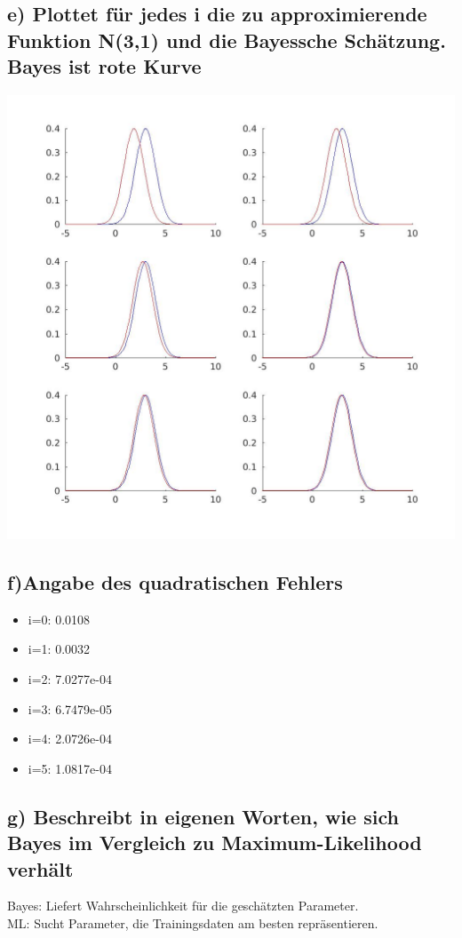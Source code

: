 \documentclass{scrartcl}
\begin{document}
\subsection*{e) Plottet für jedes i die zu approximierende Funktion N(3,1) und die Bayessche Schätzung. Bayes ist rote Kurve}
\includegraphics[width=1\textwidth]{plots/ApproxVsBayes.jpg} 

\subsection*{f)Angabe des quadratischen Fehlers }
\begin{itemize}
	\item i=0: 0.0108
	\item i=1: 0.0032
	\item i=2: 7.0277e-04
	\item i=3: 6.7479e-05
	\item i=4: 2.0726e-04
	\item i=5: 1.0817e-04
\end{itemize}

\subsection*{g) Beschreibt in eigenen Worten, wie sich Bayes im Vergleich zu Maximum-Likelihood verhält}
Bayes: Liefert Wahrscheinlichkeit für die geschätzten Parameter.\\
ML: Sucht Parameter, die Trainingsdaten am besten repräsentieren.
\end{document}
